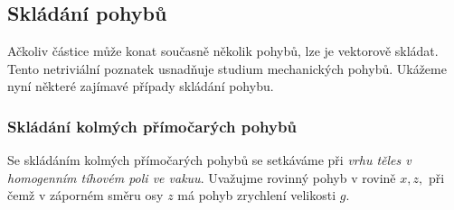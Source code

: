     \subsection{Skládání pohybů}
      Ačkoliv částice může konat současně několik pohybů, lze je vektorově skládat. Tento netriviální 
      poznatek usnadňuje studium mechanických pohybů. Ukážeme nyní některé zajímavé případy skládání pohybu.
  
    \subsubsection{Skládání kolmých přímočarých pohybů}
      Se skládáním kolmých přímočarých pohybů se setkáváme při \emph{vrhu těles v homogenním tíhovém poli ve 
      vakuu}. Uvažujme rovinný pohyb v rovině $x, z,$ při čemž v záporném směru osy $z$ má pohyb zrychlení 
      velikosti $g$.


